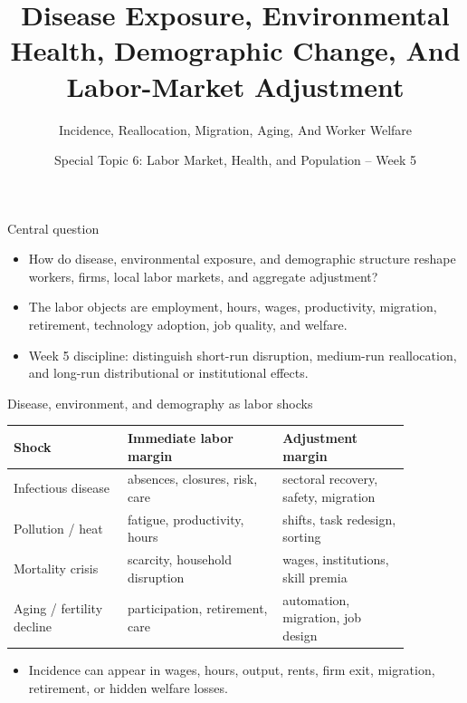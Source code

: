 \documentclass[aspectratio=169,11pt]{beamer}
\title{Disease Exposure, Environmental Health, Demographic Change, And Labor-Market Adjustment}
\subtitle{Incidence, Reallocation, Migration, Aging, And Worker Welfare}
\author{Special Topic 6: Labor Market, Health, and Population -- Week 5}
\date{}
\begin{document}
\begin{frame}
  \titlepage
\end{frame}

\begin{frame}{Central question}
\begin{itemize}
    \item How do disease, environmental exposure, and demographic structure reshape workers, firms, local labor markets, and aggregate adjustment?
    \item The labor objects are employment, hours, wages, productivity, migration, retirement, technology adoption, job quality, and welfare.
    \item Week 5 discipline: distinguish short-run disruption, medium-run reallocation, and long-run distributional or institutional effects.
\end{itemize}
\end{frame}

\begin{frame}{Disease, environment, and demography as labor shocks}
\small
\begin{tabular}{p{0.25\linewidth} p{0.34\linewidth} p{0.28\linewidth}}
\toprule
Shock & Immediate labor margin & Adjustment margin \\
\midrule
Infectious disease & absences, closures, risk, care & sectoral recovery, safety, migration \\
Pollution / heat & fatigue, productivity, hours & shifts, task redesign, sorting \\
Mortality crisis & scarcity, household disruption & wages, institutions, skill premia \\
Aging / fertility decline & participation, retirement, care & automation, migration, job design \\
\bottomrule
\end{tabular}
\vspace{0.3cm}
\begin{itemize}
    \item Incidence can appear in wages, hours, output, rents, firm exit, migration, retirement, or hidden welfare losses.
\end{itemize}
\end{frame}
\end{document}
